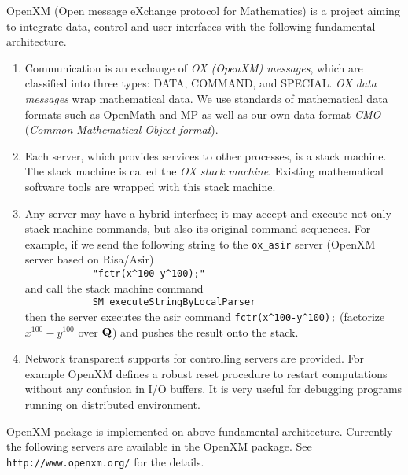 
OpenXM (Open message eXchange protocol for Mathematics)
is a project aiming to integrate data, control and user interfaces
with the following fundamental architecture.
\begin{enumerate}
\item Communication is an exchange of {\it OX (OpenXM) messages},
which are classified into three types:
DATA, COMMAND, and SPECIAL.
{\it OX data messages} wrap mathematical data.
We use standards of mathematical data formats such as OpenMath and MP
as well as our own data format {\it CMO}
({\it Common Mathematical Object format}).
\item Each server, which provides services to other processes, is a stack machine. The stack machine is called the {\it OX stack machine}.
Existing mathematical software tools are wrapped with this stack machine.
\item Any server may have a hybrid interface;
it may accept and execute not only stack machine commands, 
but also its original command sequences.
For example,
if we send the following string to the {\tt ox\_asir} server 
(OpenXM server based on Risa/Asir)\\
\verb+            "fctr(x^100-y^100);"+\\
and call the stack machine command\\
\verb+            SM_executeStringByLocalParser+\\
then the server executes the asir command
\verb+fctr(x^100-y^100);+ 
(factorize $x^{100}-y^{100}$ over ${\bf Q}$)
and pushes the result onto the stack.
\item Network transparent supports for controlling servers are provided.
For example OpenXM defines a robust reset procedure to restart computations
without any confusion in I/O buffers.
It is very useful for debugging programs running on distributed environment.
\end{enumerate}
OpenXM package  is implemented on above fundamental architecture.
Currently the following servers are available in the OpenXM package.
See {\tt http://www.openxm.org/} for the details.

